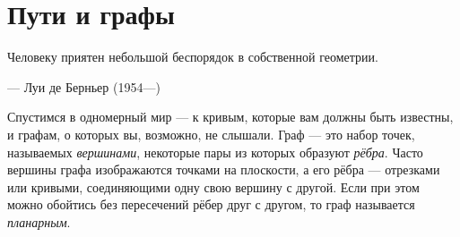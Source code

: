 \chapter{Пути и графы}

\setlength{\epigraphwidth}{.53\textwidth}
\epigraph{Человеку приятен небольшой беспорядок в собственной геометрии.}{--- Луи де Берньер (1954---)}





Спустимся в одномерный мир --- к кривым, которые вам должны быть известны, и графам, о которых вы, возможно, не слышали.
Граф --- это набор точек, называемых \emph{вершинами}, некоторые пары из которых образуют \emph{рёбра}.
Часто вершины графа изображаются точками на плоскости, а его рёбра --- отрезками или кривыми, соединяющими одну свою вершину с другой.
Если при этом можно обойтись без пересечений рёбер друг с другом, то граф называется \emph{планарным}.

